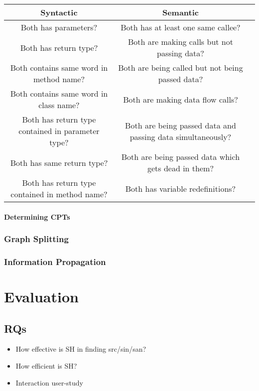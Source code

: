 \documentclass[sigconf,review,anonymous]{acmart}\settopmatter{printfolios=true,printccs=false,printacmref=false}
\begin{document}
\begin{center}
  \begin{tabular} { |c|c|c| }
    \hline
    Syntactic & Semantic\\
    \hline
    \hline
    Both has parameters? & Both has at least one same callee?\\
    Both has return type? & Both are making calls but not passing data?\\
    Both contains same word in method name? & Both are being called but not being passed data?\\
    Both contains same word in class name? & Both are making data flow calls?\\
    Both has return type contained in parameter type? & Both are being passed data and passing data simultaneously?\\
    Both has same return type? & Both are being passed data which gets dead in them?\\
    Both has return type contained in method name? & Both has variable redefinitions?\\
    \hline
  \end{tabular}
\end{center} 

\paragraph{Determining CPTs}



\subsubsection{Graph Splitting}



\subsubsection{Information Propagation}


\section{Evaluation}

\subsection{RQs}
\begin{itemize}
\item How effective is SH in finding src/sin/san?  %
\item How efficient is SH?
\item Interaction user-study %
\end{itemize}
\end{document}
